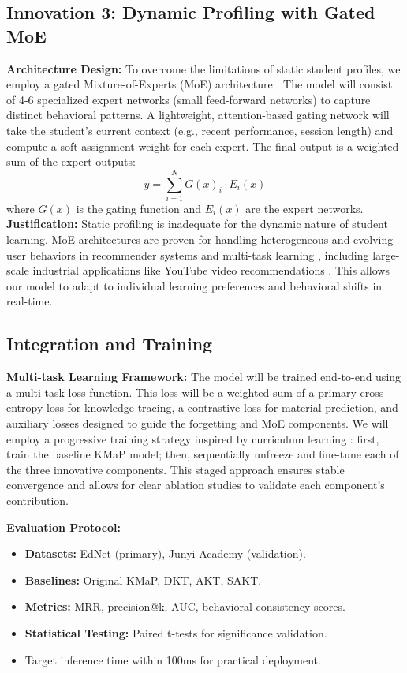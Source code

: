 \documentclass[project-plan]{report-template}
\begin{document}
\subsection{Innovation 3: Dynamic Profiling with Gated MoE}
\textbf{Architecture Design:} To overcome the limitations of static student profiles, we employ a gated Mixture-of-Experts (MoE) architecture \cite{shazeer2017outrageously,fedus2022switch,shelhamer2022mixture}. The model will consist of 4-6 specialized expert networks (small feed-forward networks) to capture distinct behavioral patterns. A lightweight, attention-based gating network will take the student's current context (e.g., recent performance, session length) and compute a soft assignment weight for each expert. The final output is a weighted sum of the expert outputs:
\begin{equation}
    y = \sum_{i=1}^{N} G(x)_i \cdot E_i(x)
\end{equation}
where $G(x)$ is the gating function and $E_i(x)$ are the expert networks.
\textbf{Justification:} Static profiling is inadequate for the dynamic nature of student learning. MoE architectures are proven for handling heterogeneous and evolving user behaviors in recommender systems and multi-task learning \cite{zou2025multi,ma2018modeling}, including large-scale industrial applications like YouTube video recommendations \cite{zhao2019recommending}. This allows our model to adapt to individual learning preferences and behavioral shifts in real-time.

\subsection{Integration and Training}
\textbf{Multi-task Learning Framework:} The model will be trained end-to-end using a multi-task loss function. This loss will be a weighted sum of a primary cross-entropy loss for knowledge tracing, a contrastive loss for material prediction, and auxiliary losses designed to guide the forgetting and MoE components. We will employ a progressive training strategy inspired by curriculum learning \cite{bengio2009curriculum}: first, train the baseline KMaP model; then, sequentially unfreeze and fine-tune each of the three innovative components. This staged approach ensures stable convergence and allows for clear ablation studies to validate each component's contribution.

\textbf{Evaluation Protocol:}
\begin{itemize}
    \item \textbf{Datasets:} EdNet (primary), Junyi Academy (validation).
    \item \textbf{Baselines:} Original KMaP, DKT, AKT, SAKT.
    \item \textbf{Metrics:} MRR, precision@k, AUC, behavioral consistency scores.
    \item \textbf{Statistical Testing:} Paired t-tests for significance validation.
    \item Target inference time within 100ms for practical deployment.
\end{itemize}
\end{document}
